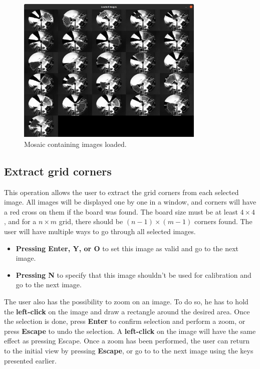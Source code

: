 \documentclass{article}
\begin{document}
\begin{figure}[H]
\centering
\includegraphics[width=0.8\textwidth]{mosaic.png}
\caption{\label{fig:mosaic}Mosaic containing images loaded.}
\end{figure}

\subsection{Extract grid corners}

This operation allows the user to extract the grid corners from each selected image.
All images will be displayed one by one in a window, and corners will have a red cross on them if the board was found. The board size must be at least $4\times 4$, and for a $n\times m$ grid, there should be $(n - 1)\times (m - 1)$ corners found.
The user will have multiple ways to go through all selected images.
\begin{itemize}
    \item \textbf{Pressing Enter, Y, or O} to set this image as valid and go to the next image.
    \item \textbf{Pressing N} to specify that this image shouldn't be used for calibration and go to the next image.
\end{itemize}

The user also has the possibility to zoom on an image. To do so, he has to hold the \textbf{left-click} on the image and draw a rectangle around the desired area. Once the selection is done, press \textbf{Enter} to confirm selection and perform a zoom, or press \textbf{Escape} to undo the selection. A \textbf{left-click} on the image will have the same effect as pressing Escape.
Once a zoom has been performed, the user can return to the initial view by pressing \textbf{Escape}, or go to to the next image using the keys presented earlier.\bigskip
\end{document}
